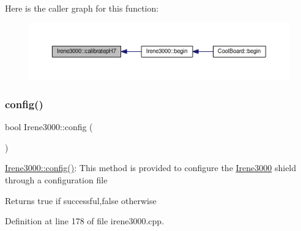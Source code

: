 Here is the caller graph for this function\+:\nopagebreak
\begin{figure}[H]
\begin{center}
\leavevmode
\includegraphics[width=350pt]{d6/d03/class_irene3000_a1d3299202e4cb7afcff9c9e3e95d94c1_icgraph}
\end{center}
\end{figure}
\mbox{\label{class_irene3000_afed5c35e4b23963c157847ef27c11e9c}} 
\subsubsection{\texorpdfstring{config()}{config()}}
{\footnotesize\ttfamily bool Irene3000\+::config (\begin{DoxyParamCaption}{ }\end{DoxyParamCaption})}

\hyperlink{class_irene3000_afed5c35e4b23963c157847ef27c11e9c}{Irene3000\+::config()}\+: This method is provided to configure the \hyperlink{class_irene3000}{Irene3000} shield through a configuration file

\begin{DoxyReturn}{Returns}
true if successful,false otherwise 
\end{DoxyReturn}


Definition at line 178 of file irene3000.\+cpp.


